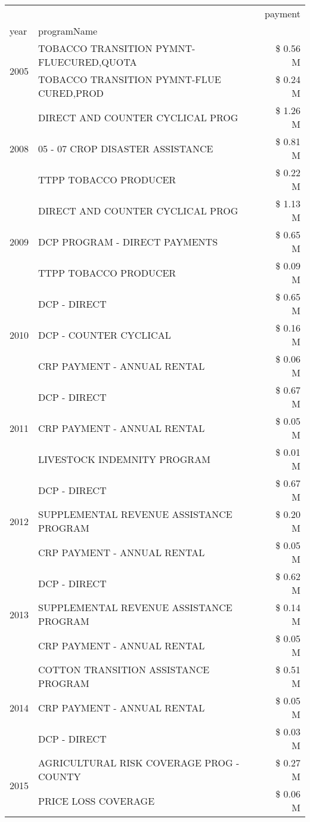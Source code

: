 \begin{tabular}{llr}
\toprule
 &  & payment \\
year & programName &  \\
\midrule
\multirow[t]{2}{*}{2005} & TOBACCO TRANSITION PYMNT-FLUECURED,QUOTA & \$ 0.56 M \\
 & TOBACCO TRANSITION PYMNT-FLUE CURED,PROD & \$ 0.24 M \\
\cline{1-3}
\multirow[t]{3}{*}{2008} & DIRECT AND COUNTER CYCLICAL PROG & \$ 1.26 M \\
 & 05 - 07 CROP DISASTER ASSISTANCE & \$ 0.81 M \\
 & TTPP TOBACCO PRODUCER & \$ 0.22 M \\
\cline{1-3}
\multirow[t]{3}{*}{2009} & DIRECT AND COUNTER CYCLICAL PROG & \$ 1.13 M \\
 & DCP PROGRAM - DIRECT PAYMENTS & \$ 0.65 M \\
 & TTPP TOBACCO PRODUCER & \$ 0.09 M \\
\cline{1-3}
\multirow[t]{3}{*}{2010} & DCP - DIRECT & \$ 0.65 M \\
 & DCP - COUNTER CYCLICAL & \$ 0.16 M \\
 & CRP PAYMENT - ANNUAL RENTAL & \$ 0.06 M \\
\cline{1-3}
\multirow[t]{3}{*}{2011} & DCP - DIRECT & \$ 0.67 M \\
 & CRP PAYMENT - ANNUAL RENTAL & \$ 0.05 M \\
 & LIVESTOCK INDEMNITY PROGRAM & \$ 0.01 M \\
\cline{1-3}
\multirow[t]{3}{*}{2012} & DCP - DIRECT & \$ 0.67 M \\
 & SUPPLEMENTAL REVENUE ASSISTANCE PROGRAM & \$ 0.20 M \\
 & CRP PAYMENT - ANNUAL RENTAL & \$ 0.05 M \\
\cline{1-3}
\multirow[t]{3}{*}{2013} & DCP - DIRECT & \$ 0.62 M \\
 & SUPPLEMENTAL REVENUE ASSISTANCE PROGRAM & \$ 0.14 M \\
 & CRP PAYMENT - ANNUAL RENTAL & \$ 0.05 M \\
\cline{1-3}
\multirow[t]{3}{*}{2014} & COTTON TRANSITION ASSISTANCE PROGRAM & \$ 0.51 M \\
 & CRP PAYMENT - ANNUAL RENTAL & \$ 0.05 M \\
 & DCP - DIRECT & \$ 0.03 M \\
\cline{1-3}
\multirow[t]{3}{*}{2015} & AGRICULTURAL RISK COVERAGE PROG - COUNTY & \$ 0.27 M \\
 & PRICE LOSS COVERAGE & \$ 0.06 M \\

\end{tabular}
